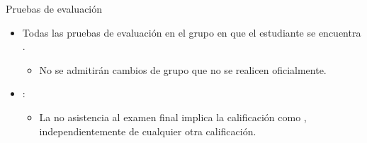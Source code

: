 \begin{frame}[t]{Pruebas de evaluación}
\begin{itemize}
  \item Todas las pruebas de evaluación  
        en el grupo en que el estudiante se encuentra .
    \begin{itemize}
      \item No se admitirán cambios de grupo que no se realicen oficialmente.
    \end{itemize}

  \item {}:   
\begin{itemize}
      \item La no asistencia al examen final 
            implica la calificación como , 
            independientemente de cualquier otra calificación.
    \end{itemize}
\end{itemize}
\end{frame}
